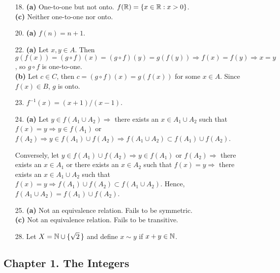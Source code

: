 {\begin{itemize}
\bf\item[18.]\rm
{\bf (a)}  One-to-one but not onto. $f({\Bbb R} ) = \{ x \in {\Bbb R} : x
> 0 \}$. \\
{\bf (c)} Neither one-to-one nor onto.
 
\bf\item[20.]\rm
{\bf (a)} $f(n) = n + 1$.
 
\bf\item[22.]\rm
{\bf (a)} Let $x, y \in A$. Then $g(f(x)) = (g \circ f)(x) = (g \circ
f)(y) = g(f(y)) \Rightarrow f(x) = f(y) \Rightarrow x = y$,  so $g
\circ f$ is one-to-one. \\
{\bf (b)} Let $c \in C$, then $c = (g \circ f)(x) = g(f(x))$ for some
$x \in A$. Since $f(x) \in B$, $g$ is onto.
 
\bf\item[23.]\rm
$f^{-1}(x) = (x+1)/(x-1)$.
 
\bf\item[24.]\rm
{\bf (a)}  Let $y \in f(A_1 \cup A_2) \Rightarrow$ there exists an $x
\in A_1 \cup A_2$ such that $f(x) = y \Rightarrow y \in f(A_1)$ or
$f(A_2) \Rightarrow y \in f(A_1) \cup f(A_2) \Rightarrow f(A_1 \cup A_2)
\subset f(A_1) \cup f(A_2)$.
 
Conversely, let $y \in f(A_1) \cup f(A_2) \Rightarrow y \in f(A_1)$ or
$f(A_2) \Rightarrow$ there exists an $x \in A_1$ or there exists an
$x \in A_2$ such that $f(x) = y \Rightarrow$ there exists an $x \in
A_1 \cup A_2$ such that $f(x) = y \Rightarrow f(A_1) \cup f(A_2)
\subset f(A_1 \cup A_2)$. Hence, $f(A_1 \cup A_2) = f(A_1) \cup f(A_2)$. 
 
\bf\item[25.]\rm
{\bf (a)} Not an equivalence relation. Fails to be symmetric.\\
{\bf (c)} Not an equivalence relation. Fails to be transitive.
 
\bf\item[28.]\rm
Let $X = {\Bbb N} \cup \{ \sqrt{2}\, \}$ and define $x \sim y$ if $x + y
\in {\Bbb N}$.
 
\end{itemize}
}
 
 
 
\subsection*{Chapter 1. The Integers}
 
